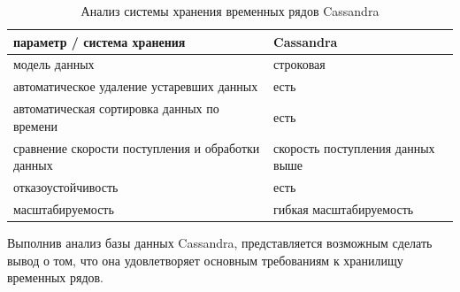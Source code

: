 \begin{table}[h!]
    \caption{Анализ системы хранения временных рядов Cassandra}
    \label{tab_mem}
    \centering
    \begin{tabular}{||p{7cm}|p{7cm}||}
        \hline
        {параметр / система хранения} & Cassandra\\
        \hline \hline
        {модель данных} & строковая \\
        \hline
        {автоматическое удаление устаревших данных} & есть \\
        \hline
        {автоматическая сортировка данных по времени} & есть \\
        \hline
        {сравнение скорости поступления и обработки данных} &  {скорость поступления данных выше} \\
        \hline
        {отказоустойчивость} & есть \\
        \hline
        {масштабируемость} & {гибкая масштабируемость} \\
        \hline \hline
    \end{tabular}
\end{table}

Выполнив анализ базы данных Cassandra, представляется возможным
сделать вывод о том, что она удовлетворяет основным требованиям к
хранилищу временных рядов.